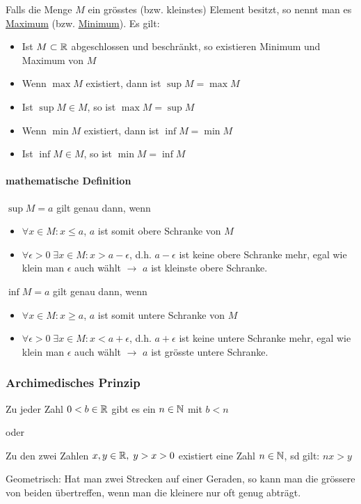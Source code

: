 Falls die Menge $M$ ein grösstes (bzw. kleinstes) Element besitzt, so nennt man es \underline{Maximum} (bzw. \underline{Minimum}).
Es gilt:
\begin{itemize}
	\item Ist $M \subset \mathbb{R}$ abgeschlossen und beschränkt, so existieren Minimum und Maximum von $M$
	\item Wenn $\max M$ existiert, dann ist $\sup M = \max M$
	\item Ist $\sup M \in M$, so ist $\max M = \sup M$
	\item Wenn $\min M$ existiert, dann ist $\inf M = \min M$
	\item Ist $\inf M \in M$, so ist $\min M = \inf M$
\end{itemize}

\paragraph{mathematische Definition}
$\sup M = a$ gilt genau dann, wenn
\begin{itemize}
	\item $\forall x \in M: x \leq a$, $a$ ist somit obere Schranke von $M$
	\item $\forall \epsilon > 0 \; \exists x \in M: x > a - \epsilon$, d.h. $a - \epsilon$ ist keine obere Schranke mehr, egal wie klein man $\epsilon$ auch wählt $\rightarrow$ $a$ ist kleinste obere Schranke.
\end{itemize}

$\inf M = a$ gilt genau dann, wenn
\begin{itemize}
	\item $\forall x \in M: x \geq a$, $a$ ist somit untere Schranke von $M$
	\item $\forall \epsilon > 0 \; \exists x \in M: x < a + \epsilon$, d.h. $a + \epsilon$ ist keine untere Schranke mehr, egal wie klein man $\epsilon$ auch wählt $\rightarrow$ $a$ ist grösste untere Schranke.
\end{itemize}

\subsubsection{Archimedisches Prinzip}
\begin{satz}
Zu jeder Zahl $0 < b \in \mathbb{R}$ gibt es ein $n \in \mathbb{N}$ mit $b < n$
\end{satz}

oder

\begin{satz}
Zu den zwei Zahlen $x, y \in \mathbb{R}, \; y > x > 0$ existiert eine Zahl $n \in \mathbb{N}$, sd gilt: $nx > y$
\end{satz}

Geometrisch: Hat man zwei Strecken auf einer Geraden, so kann man die grössere von beiden übertreffen, wenn man die kleinere nur oft genug abträgt.
\pagebreak
